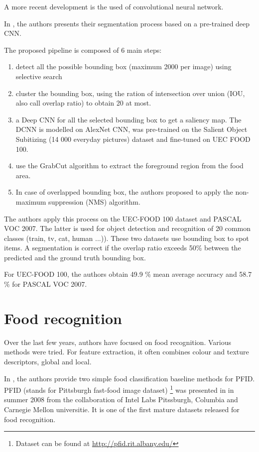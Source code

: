 
A more recent development is the used of convolutional neural network.

In \cite{Shimoda2015}, the authors presents their segmentation process based on a pre-trained deep CNN.

The proposed pipeline is composed of 6 main steps:
\begin{enumerate}
    \item detect all the possible bounding box (maximum 2000 per image) using selective search
    \item cluster the bounding box, using the ration of intersection over union (IOU, also call overlap ratio) to obtain 20 at most.
    \item a Deep CNN for all the selected bounding box to get a saliency map. The DCNN is modelled on AlexNet CNN, was pre-trained on the Salient Object Subitizing (14 000 everyday pictures) dataset and fine-tuned on UEC FOOD 100.
    \item use the GrabCut algorithm to extract the foreground region from the food area. 
    \item In case of overlapped bounding box, the authors proposed to apply the non-maximum suppression (NMS) algorithm.
\end{enumerate}

The authors apply this process on the UEC-FOOD 100 dataset and PASCAL VOC 2007. The latter is used for object detection and recognition of 20 common classes (train, tv, cat, human ...)). These two datasets use bounding box to spot items. A segmentation is correct if the overlap ratio exceeds 50\% between the predicted and the ground truth bounding box.

For UEC-FOOD 100, the authors obtain 49.9 \% mean average accuracy and 58.7 \% for PASCAL VOC 2007.

\section{Food recognition}

%
%

Over the last few years, authors have focused on food recognition. Various methods were tried. For feature extraction, it often combines colour and texture descriptors, global and local.

In \cite{Chen2009}, the authors provide two simple food classification baseline methods for PFID. PFID (stands for Pittsburgh fast-food image dataset) \footnote{Dataset can be found at \url{http://pfid.rit.albany.edu/}} was presented in \cite{Chen2009} in summer 2008 from the collaboration of Intel Labs Pitssburgh, Columbia and Carnegie Mellon universitie. It is one of the first mature datasets released for food recognition.

